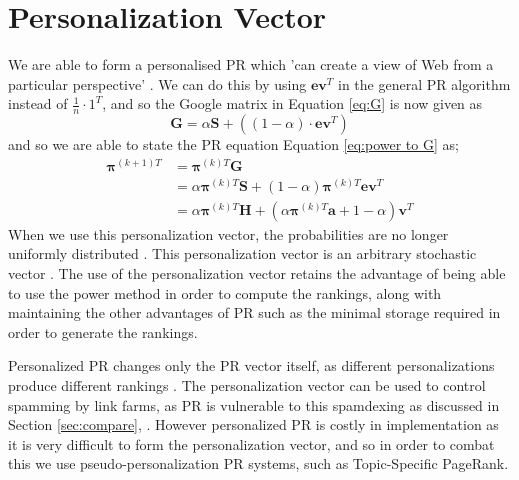 \documentclass[11pt]{report}
\begin{document}
{\section{Personalization Vector} \label{sec:Personalization}
We are able to form a personalised PR which 'can create a view of Web from a particular perspective' \cite{page1999pagerank}. We can do this by using $\textbf{ev}^T$ in the general PR algorithm instead of $\frac{1}{n}\cdot1^T$, and so the Google matrix in Equation \eqref{eq:G} is now given as \begin{equation}\label{eq:Personalisation G}
\textbf{G}=\alpha\textbf{S}+\left((1-\alpha)\cdot\textbf{ev}^T\right)
\end{equation} and so we are able to state the PR equation Equation \eqref{eq:power to G} as; 
\begin{align}
\boldsymbol{\pi}^{(k+1)T} &= \boldsymbol{\pi}^{(k)T}\textbf{G} \nonumber \\
&= \alpha\boldsymbol{\pi}^{(k)T}\textbf{S} + (1-\alpha)\boldsymbol{\pi}^{(k)T}\textbf{ev}^T \nonumber \\
&= \alpha\boldsymbol{\pi}^{(k)T}\textbf{H} + \left(\alpha\boldsymbol{\pi}^{(k)T}\textbf{a} + 1 - \alpha\right)\textbf{v}^T \label{eq:Power personalization}
\end{align}
When we use this personalization vector, the probabilities are no longer uniformly distributed \cite{langville}. This personalization vector is an arbitrary stochastic vector \cite{bonato}. The use of the personalization vector retains the advantage of being able to use the power method in order to compute the rankings, along with maintaining the other advantages of PR such as the minimal storage required in order to generate the rankings.

Personalized PR changes only the PR vector itself, as different personalizations produce different rankings \cite{thorson2004modeling}. The personalization vector can be used to control spamming by link farms, as PR is vulnerable to this spamdexing as discussed in Section \ref{sec:compare}, \cite{thorson2004modeling}. However personalized PR is costly in implementation as it is very difficult to form the personalization vector, and so in order to combat this we use pseudo-personalization PR systems, such as Topic-Specific PageRank.

}
\end{document}
